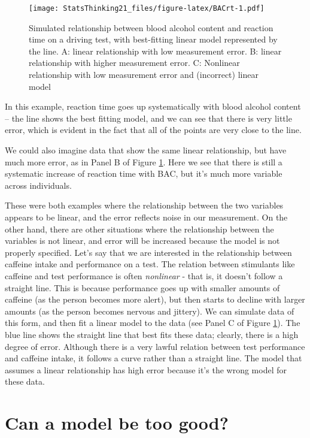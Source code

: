 \documentclass[
  12pt,
]{book}
\begin{document}
\begin{figure}
\centering
\texttt{[image: StatsThinking21\_files/figure-latex/BACrt-1.pdf]}
\caption{\label{fig:BACrt}Simulated relationship between blood alcohol content and reaction time on a driving test, with best-fitting linear model represented by the line. A: linear relationship with low measurement error. B: linear relationship with higher measurement error. C: Nonlinear relationship with low measurement error and (incorrect) linear model}
\end{figure}

In this example, reaction time goes up systematically with blood alcohol content -- the line shows the best fitting model, and we can see that there is very little error, which is evident in the fact that all of the points are very close to the line.

We could also imagine data that show the same linear relationship, but have much more error, as in Panel B of Figure \ref{fig:BACrt}. Here we see that there is still a systematic increase of reaction time with BAC, but it's much more variable across individuals.

These were both examples where the relationship between the two variables appears to be linear, and the error reflects noise in our measurement. On the other hand, there are other situations where the relationship between the variables is not linear, and error will be increased because the model is not properly specified. Let's say that we are interested in the relationship between caffeine intake and performance on a test. The relation between stimulants like caffeine and test performance is often \emph{nonlinear} - that is, it doesn't follow a straight line. This is because performance goes up with smaller amounts of caffeine (as the person becomes more alert), but then starts to decline with larger amounts (as the person becomes nervous and jittery). We can simulate data of this form, and then fit a linear model to the data (see Panel C of Figure \ref{fig:BACrt}). The blue line shows the straight line that best fits these data; clearly, there is a high degree of error. Although there is a very lawful relation between test performance and caffeine intake, it follows a curve rather than a straight line. The model that assumes a linear relationship has high error because it's the wrong model for these data.

\hypertarget{overfitting}{%
\section{Can a model be too good?}\label{overfitting}}
\end{document}
